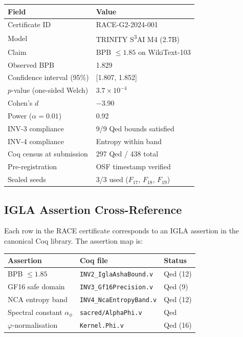 \begin{longtable}[]{@{}ll@{}}
\toprule\noalign{}
Field & Value \\
\midrule\noalign{}
\endhead
\bottomrule\noalign{}
\endlastfoot
Certificate ID & RACE-G2-2024-001 \\
Model & TRINITY S\textsuperscript{3}AI M4 (2.7B) \\
Claim & BPB \(\leq 1.85\) on WikiText-103 \\
Observed BPB & 1.829 \\
Confidence interval (95\%) & {[}1.807, 1.852{]} \\
\(p\)-value (one-sided Welch) & \(3.7 \times 10^{-4}\) \\
Cohen's \(d\) & $-$3.90 \\
Power (\(\alpha = 0.01\)) & 0.92 \\
INV-3 compliance & 9/9 Qed bounds satisfied \\
INV-4 compliance & Entropy within band \\
Coq census at submission & 297 Qed / 438 total \\
Pre-registration & OSF timestamp verified \\
Sealed seeds & 3/3 used (\(F_{17}\), \(F_{18}\),
\(F_{19}\)) \\
\end{longtable}

\subsection{IGLA Assertion
Cross-Reference}\label{app_e:igla-assertion-xref}

Each row in the RACE certificate corresponds to an
IGLA assertion in the canonical Coq library. The
assertion map is:

\begin{longtable}[]{@{}lll@{}}
\toprule\noalign{}
Assertion & Coq file & Status \\
\midrule\noalign{}
\endhead
\bottomrule\noalign{}
\endlastfoot
BPB \(\leq 1.85\) &
\texttt{INV2\_IglaAshaBound.v} & Qed (12) \\
GF16 safe domain &
\texttt{INV3\_Gf16Precision.v} & Qed (9) \\
NCA entropy band &
\texttt{INV4\_NcaEntropyBand.v} & Qed (12) \\
Spectral constant \(\alpha_\phi\) &
\texttt{sacred/AlphaPhi.v} & Qed \\
\(\varphi\)-normalisation &
\texttt{Kernel.Phi.v} & Qed (16) \\
\end{longtable}

